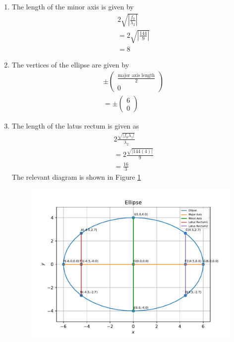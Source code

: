 \documentclass[12pt]{article}
\providecommand{\brak}[1]{\ensuremath{\left(#1\right)}}
\providecommand{\abs}[1]{\left\vert#1\right\vert}
\newcommand{\myvec}[1]{\ensuremath{\begin{pmatrix}#1\end{pmatrix}}}
\begin{document}
\begin{enumerate}
\begin{enumerate}
\item  The length of the minor axis is given by
\begin{align}
	\label{eq:minorLength}
	& 2\sqrt{\abs{\frac{f_0}{\lambda_2}}}\\
	&= 2\sqrt{\abs{\frac{144}{9}}}\\
	&= 8
\end{align}
\item The vertices of the ellipse are given by 
\begin{align}
	& \pm\myvec{\frac{\text{major axis length}}{2} \\ 0} \\
	&= \pm\myvec{6 \\ 0}
\end{align}
\item The length of the latus rectum is given as 
\begin{align}
	\label{eq:eqLatRectLen}
	& 2\frac{\sqrt{\abs{f_0\lambda_1}}}{\lambda_2} \\
	&= 2\frac{\sqrt{\abs{144\brak{4}}}}{9} \\
	&= \frac{16}{3}
\end{align}
The relevant diagram is shown in Figure \ref{fig:Fig1}
\begin{figure}[!h]
	\begin{center}
		\includegraphics[width=\columnwidth]{./figs/problem1.pdf}
	\end{center}
\caption{}
\label{fig:Fig1}
\end{figure}
\end{enumerate}
\end{enumerate}
\end{document}
